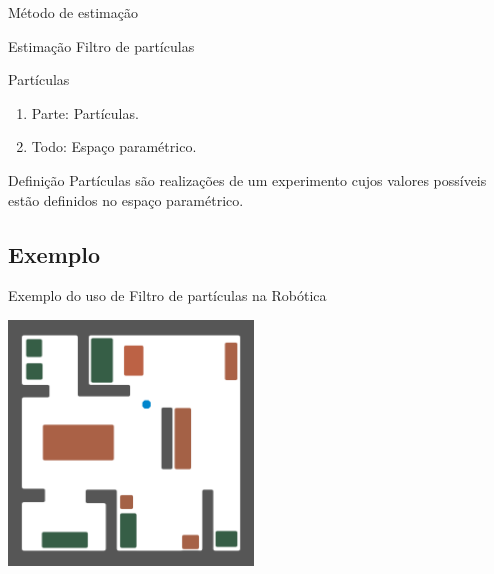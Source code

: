 \documentclass{beamer}
\begin{document}
\begin{frame}{Método de estimação}
    \begin{block}{Estimação}
      \Huge  Filtro de partículas
    \end{block}

\end{frame}



\begin{frame}{Partículas}
\noindent


    \begin{enumerate}
      \item<2-| alert@2> Parte: Partículas.
      \item<3-| alert@3> Todo: Espaço paramétrico.
    \end{enumerate}
    
\pause
\pause
\pause
  \begin{block}{Definição}
  {\large Partículas são realizações de um experimento cujos valores possíveis estão definidos no espaço paramétrico.}
\end{block}


 
\end{frame}


\subsection*{Exemplo}
\begin{frame}{Exemplo do uso de Filtro de partículas na Robótica}

 
  \begin{center}
  \includegraphics[height=6.5cm,keepaspectratio]{1-particle-filter.png}
  \end{center}

\end{frame}
\end{document}
